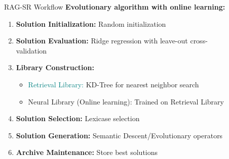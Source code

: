 \documentclass[final]{beamer}
\newcommand{\hlblue}[1]{\textcolor{mainblue}{#1}}
\newcommand{\hlpurple}[1]{\textcolor{deepplum}{#1}}
\newcommand{\hlteal}[1]{\textcolor{teal}{#1}}
\newlength{\sepwid}
\newlength{\onecolwid}
\begin{document}
\begin{frame}[t]
\begin{columns}[t]
\begin{column}{\onecolwid}
\begin{block}{RAG-SR Workflow}
                    \textbf{\hlblue{Evolutionary algorithm with online learning:}}
                    \begin{enumerate}
                        \item \textbf{Solution Initialization:} Random initialization
                        \item \textbf{Solution Evaluation:} Ridge regression with leave-out cross-validation
                        \item \textbf{Library Construction:}
                        \begin{itemize}
                            \item \hlteal{Retrieval Library:} KD-Tree for nearest neighbor search
                            \item \hlpurple{Neural Library (Online learning):} Trained on Retrieval Library
                        \end{itemize}
                        \item \textbf{Solution Selection:} Lexicase selection
                        \item \textbf{Solution Generation:} Semantic Descent/Evolutionary operators
                        \item \textbf{Archive Maintenance:} Store best solutions
                    \end{enumerate}
                \end{block}



            \end{column} %

            \begin{column}{\sepwid}\end{column} %

            \begin{column}{\onecolwid} %




\end{column}
\end{columns}
\end{frame}
\end{document}
